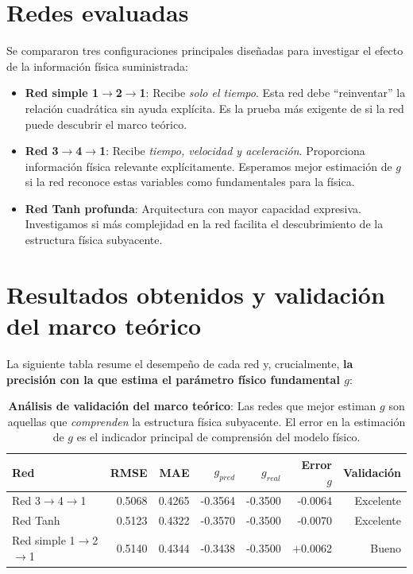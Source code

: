 \documentclass[11pt]{article}
\begin{document}
	\section{Redes evaluadas}
	Se compararon tres configuraciones principales diseñadas para investigar el efecto de la información física suministrada:
	
	\begin{itemize}
		\item \textbf{Red simple 1$\rightarrow$2$\rightarrow$1}: Recibe \textit{solo el tiempo}. Esta red debe \enquote{reinventar} la relación cuadrática sin ayuda explícita. Es la prueba más exigente de si la red puede descubrir el marco teórico.
		\item \textbf{Red 3$\rightarrow$4$\rightarrow$1}: Recibe \textit{tiempo, velocidad y aceleración}. Proporciona información física relevante explícitamente. Esperamos mejor estimación de $g$ si la red reconoce estas variables como fundamentales para la física.
		\item \textbf{Red Tanh profunda}: Arquitectura con mayor capacidad expresiva. Investigamos si más complejidad en la red facilita el descubrimiento de la estructura física subyacente.
	\end{itemize}
	
	\section{Resultados obtenidos y validación del marco teórico}
	La siguiente tabla resume el desempeño de cada red y, crucialmente, \textbf{la precisión con la que estima el parámetro físico fundamental $g$}:
	
	\begin{table}[h]
		\centering
		\begin{tabular}{lrrrrrr}
			\toprule
			Red & RMSE & MAE & $g_{pred}$ & $g_{real}$ & Error $g$ & Validación \\
			\midrule
			Red 3$\rightarrow$4$\rightarrow$1 & 0.5068 & 0.4265 & -0.3564 & -0.3500 & -0.0064 & Excelente \\
			Red Tanh & 0.5123 & 0.4322 & -0.3570 & -0.3500 & -0.0070 & Excelente \\
			Red simple 1$\rightarrow$2$\rightarrow$1 & 0.5140 & 0.4344 & -0.3438 & -0.3500 & +0.0062 & Bueno \\
			\bottomrule
		\end{tabular}
		\caption{\textbf{Análisis de validación del marco teórico}: Las redes que mejor estiman $g$ son aquellas que \textit{comprenden} la estructura física subyacente. El error en la estimación de $g$ es el indicador principal de comprensión del modelo físico.}
		\label{tab:validation}
	\end{table}
	
\end{document}
